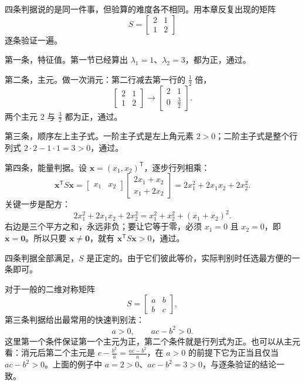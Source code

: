 \documentclass[UTF8,a4paper,12pt]{ctexart}
\numberwithin{equation}{section}
\newcommand{\trans}{^{\mathsf T}}
\begin{document}
	四条判据说的是同一件事，但验算的难度各不相同。用本章反复出现的矩阵
	\begin{equation}\label{eq:7.70}
	S=
	\begin{bmatrix}
		2&1\\
		1&2
	\end{bmatrix}
	\end{equation}
	逐条验证一遍。

	第一条，特征值。第一节已经算出 $\lambda_1=1$、$\lambda_2=3$，都为正，通过。

	第二条，主元。做一次消元：第二行减去第一行的 $\frac{1}{2}$ 倍，
	\begin{equation}\label{eq:7.71}
	\begin{bmatrix}
		2&1\\
		1&2
	\end{bmatrix}
	\longrightarrow
	\begin{bmatrix}
		2&1\\
		0&\frac{3}{2}
	\end{bmatrix}.
	\end{equation}
	两个主元 $2$ 与 $\frac{3}{2}$ 都为正，通过。

	第三条，顺序左上主子式。一阶主子式是左上角元素 $2>0$；二阶主子式是整个行列式 $2\cdot2-1\cdot1=3>0$，通过。

	第四条，能量判据。设 $\bm{x}=(x_1,x_2)\trans$，逐步行列相乘：
	\begin{equation}\label{eq:7.72}
	\bm{x}\trans S\bm{x}
	=
	\begin{bmatrix}
		x_1&x_2
	\end{bmatrix}
	\begin{bmatrix}
		2x_1+x_2\\
		x_1+2x_2
	\end{bmatrix}
	=2x_1^2+2x_1x_2+2x_2^2.
	\end{equation}
	关键一步是配方：
	\begin{equation}\label{eq:7.73}
	2x_1^2+2x_1x_2+2x_2^2
	=x_1^2+x_2^2+(x_1+x_2)^2.
	\end{equation}
	右边是三个平方之和，永远非负；要让它等于零，必须 $x_1=0$ 且 $x_2=0$，即 $\bm{x}=\bm{0}$。所以只要 $\bm{x}\neq\bm{0}$，就有 $\bm{x}\trans S\bm{x}>0$，通过。

	四条判据全部满足，$S$ 是正定的。由于它们彼此等价，实际判别时任选最方便的一条即可。

	对于一般的二维对称矩阵
	\begin{equation}\label{eq:7.74}
	S=
	\begin{bmatrix}
		a&b\\
		b&c
	\end{bmatrix},
	\end{equation}
	第三条判据给出最常用的快速判别法：
	\begin{equation}\label{eq:7.75}
	\boxed{a>0,\qquad ac-b^2>0.}
	\end{equation}
	这里第一个条件保证第一个主元为正，第二个条件就是行列式为正。也可以从主元看：消元后第二个主元是 $c-\frac{b^2}{a}=\frac{ac-b^2}{a}$，在 $a>0$ 的前提下它为正当且仅当 $ac-b^2>0$。上面的例子中 $a=2>0$、$ac-b^2=3>0$，与逐条验证的结论一致。
\end{document}
